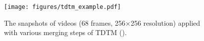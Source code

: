 \begin{figure}[!htb]
    \centering
    \texttt{[image: figures/tdtm\_example.pdf]}
    \caption{The snapshots of videos (68 frames, 256×256 resolution) applied with various merging steps of TDTM ().} 
    \label{fig:tdtm-generated-frames}
\end{figure}

